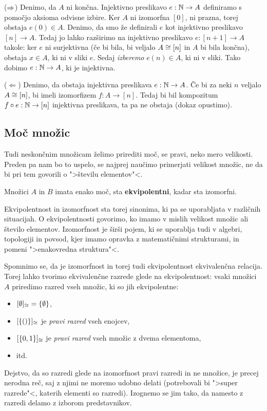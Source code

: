 \begin{dokaz}

($\Rightarrow$)
%
Denimo, da $A$ ni končna.
Injektivno preslikavo $e : \mathbb{N} \to A$ definiramo s pomočjo aksioma odvisne izbire.
Ker $A$ ni izomorfna $[0]$, ni prazna, torej obstaja $e(0) \in A$.
Denimo, da smo že definirali $e$ kot injektivno preslikavo $[n] \to A$.
Tedaj jo lahko razširimo na injektivno preslikavo $e : [n+1] \to A$ takole: ker $e$ ni surjektivna (če bi bila, bi veljalo $A \cong [n]$ in $A$ bi bila končna), obstaja $x \in A$, ki ni v sliki $e$.
Sedaj \emph{izberemo} $e(n) \in A$, ki ni v sliki.
Tako dobimo $e : \mathbb{N} \to A$, ki je injektivna.

($\Leftarrow$)
%
Denimo, da obstaja injektivna preslikava $e : \mathbb{N} \to A$.
Če bi za neki $n$ veljalo $A \cong [n]$, bi imeli izomorfizem $f : A \to [n]$.
Tedaj bi bil kompozitum $f \circ e : \mathbb{N} \to [n]$ injektivna preslikava, ta pa ne obstaja (dokaz opustimo).
\end{dokaz}

\subsection{Moč množic}

Tudi neskončnim množicam želimo prirediti moč, se pravi, neko mero velikosti. Preden pa nam bo to uspelo, se najprej naučimo primerjati velikost množic, ne da bi pri tem govorili o ">številu elementov"<.

\begin{definicija}
  Množici $A$ in $B$ imata enako moč, sta \textbf{ekvipolentni}, kadar sta izomorfni.
\end{definicija}

Ekvipolentnost in izomorfnost sta torej sinonima, ki pa se uporabljata v različnih situacijah. O ekvipolentnosti govorimo, ko imamo v mislih velikost množic ali število elementov. Izomorfnost je širši pojem, ki se uporablja tudi v algebri, topologiji in povsod, kjer imamo opravka z matematičnimi strukturami, in pomeni ">enakovredna struktura"<.

Spomnimo se, da je izomorfnost in torej tudi ekvipolentnost ekvivalenčna relacija.
Torej lahko tvorimo ekvivalenčne razrede glede na ekvipolentnost: vsaki množici $A$ priredimo razred vseh množic, ki so jih ekvipolentne:
%
\begin{itemize}
\item $[\emptyset]_{\cong} = \{ \emptyset \}$,
\item $[\left\{ () \right\}]_{\cong}$ je \emph{pravi razred} vseh enojcev,
\item $[\left\{0, 1\right\}]_{\cong}$ je \emph{pravi razred} vseh množic z dvema elementoma,
\item itd.
\end{itemize}
%
Dejstvo, da so razredi glede na izomorfnost pravi razredi in ne množice, je precej nerodna reč, saj z njimi ne moremo udobno delati (potrebovali bi ">super razrede"<, katerih elementi so razredi).
Izognemo se jim tako, da namesto z razredi delamo z izborom predstavnikov.

